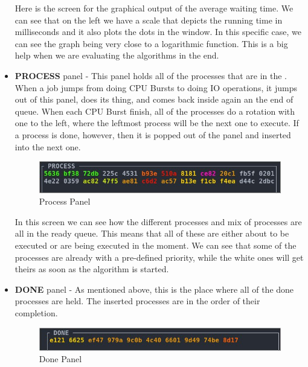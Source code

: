 \documentclass{article}
\newcommand{\code}[1]{\codeinline{\texttt{#1}}}
\begin{document}
\begin{itemize}
  Here is the screen for the graphical output of the average waiting time. We can see that on the left we have a scale that depicts the running time in milliseconds and it also plots the dots in the window. In this specific case, we can see the graph being very close to a logarithmic function. This is a big help when we are evaluating the algorithms in the end.

\item \textbf{PROCESS} panel - This panel holds all of the processes that are in the \code{ready\_queue}. When a job jumps from doing CPU Bursts to doing IO operations, it jumps out of this panel, does its thing, and comes back inside again an the end of queue. When each CPU Burst finish, all of the processes do a rotation with one to the left, where the leftmost process will be the next one to execute. If a process is done, however, then it is popped out of the panel and inserted into the next one.

  \begin{figure}[H]
    \includegraphics[width=\linewidth]{./pics/prcs.jpg}
    \caption{Process Panel}
    \label{fig:Process Panel}
  \end{figure}

  In this screen we can see how the different processes and mix of processes are all in the ready queue. This means that all of these are either about to be executed or are being executed in the moment. We can see that some of the processes are already with a pre-defined priority, while the white ones will get theirs as soon as the algorithm is started.

\item \textbf{DONE} panel - As mentioned above, this is the place where all of the done processes are held. The inserted processes are in the order of their completion.

  \begin{figure}[H]
    \centering
    \includegraphics[width=\linewidth]{./pics/doneq.jpg}
    \caption{Done Panel}
    \label{fig:Done Panel}
  \end{figure}


\end{itemize}
\end{document}
